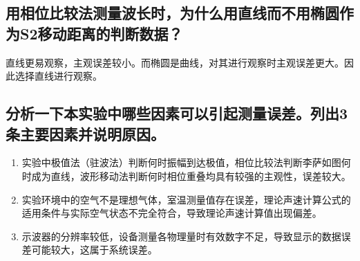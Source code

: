 \documentclass{ctexart}
\begin{document}
\subsection{用相位比较法测量波长时，为什么用直线而不用椭圆作为S2移动距离的判断数据？}

直线更易观察，主观误差较小。而椭圆是曲线，对其进行观察时主观误差更大。因此选择直线进行观察。

\subsection{分析一下本实验中哪些因素可以引起测量误差。列出3条主要因素并说明原因。}

\begin{enumerate}
    \item 实验中极值法（驻波法）判断何时振幅到达极值，相位比较法判断李萨如图何时成为直线，波形移动法判断何时相位重叠均具有较强的主观性，误差较大。
    \item 实验环境中的空气不是理想气体，室温测量值存在误差，理论声速计算公式的适用条件与实际空气状态不完全符合，导致理论声速计算值出现偏差。
    \item 示波器的分辨率较低，设备测量各物理量时有效数字不足，导致显示的数据误差可能较大，这属于系统误差。
\end{enumerate}
\end{document}
